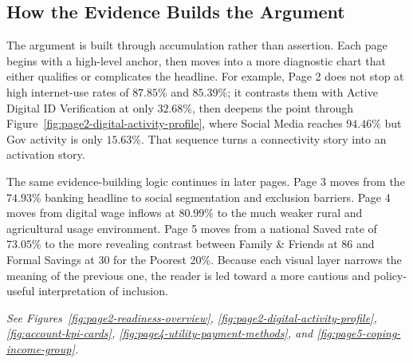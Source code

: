\documentclass[../main.tex]{subfiles}
\begin{document}
\subsection{How the Evidence Builds the Argument}
\label{subsec:storytelling-principles}

The argument is built through accumulation rather than assertion. Each page
begins with a high-level anchor, then moves into a more diagnostic chart that
either qualifies or complicates the headline. For example, Page 2 does not stop
at high internet-use rates of \(87.85\%\) and \(85.39\%\); it contrasts them
with Active Digital ID Verification at only \(32.68\%\), then deepens the point
through Figure~\ref{fig:page2-digital-activity-profile}, where Social Media
reaches \(94.46\%\) but Gov activity is only \(15.63\%\). That sequence turns a
connectivity story into an activation story.

The same evidence-building logic continues in later pages. Page 3 moves from
the \(74.93\%\) banking headline to social segmentation and exclusion barriers.
Page 4 moves from digital wage inflows at \(80.99\%\) to the much weaker rural
and agricultural usage environment. Page 5 moves from a national Saved rate of
\(73.05\%\) to the more revealing contrast between Family \& Friends at 86 and
Formal Savings at 30 for the Poorest 20\%. Because each visual layer narrows
the meaning of the previous one, the reader is led toward a more cautious and
policy-useful interpretation of inclusion.

\noindent\textit{See Figures~\ref{fig:page2-readiness-overview},
\ref{fig:page2-digital-activity-profile}, \ref{fig:account-kpi-cards},
\ref{fig:page4-utility-payment-methods}, and
\ref{fig:page5-coping-income-group}.}
\end{document}
